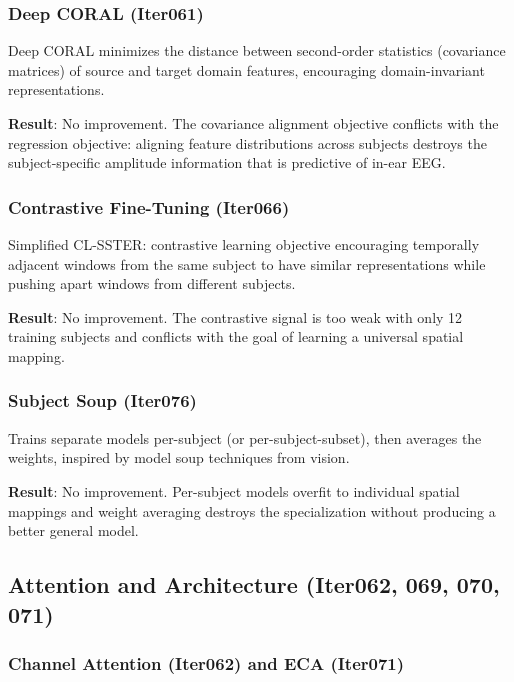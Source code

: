\documentclass[11pt,a4paper]{article}
\begin{document}
\subsubsection{Deep CORAL (Iter061)}

Deep CORAL minimizes the distance between second-order statistics
(covariance matrices) of source and target domain features, encouraging
domain-invariant representations.

\textbf{Result}: No improvement. The covariance alignment objective
conflicts with the regression objective: aligning feature distributions
across subjects destroys the subject-specific amplitude information that
is predictive of in-ear EEG.

\subsubsection{Contrastive Fine-Tuning (Iter066)}

Simplified CL-SSTER: contrastive learning objective encouraging temporally
adjacent windows from the same subject to have similar representations
while pushing apart windows from different subjects.

\textbf{Result}: No improvement. The contrastive signal is too weak with
only 12 training subjects and conflicts with the goal of learning a
universal spatial mapping.

\subsubsection{Subject Soup (Iter076)}

Trains separate models per-subject (or per-subject-subset), then averages
the weights, inspired by model soup techniques from vision.

\textbf{Result}: No improvement. Per-subject models overfit to individual
spatial mappings and weight averaging destroys the specialization without
producing a better general model.

\subsection{Attention and Architecture (Iter062, 069, 070, 071)}

\subsubsection{Channel Attention (Iter062) and ECA (Iter071)}
\end{document}
